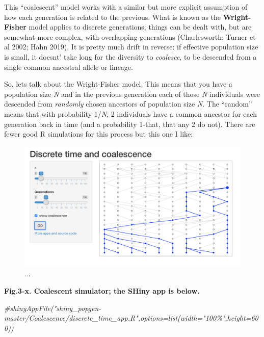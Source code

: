 \documentclass[
]{article}
\newenvironment{Shaded}{\begin{snugshade}}{\end{snugshade}}
\newcommand{\CommentTok}[1]{\textcolor[rgb]{0.56,0.35,0.01}{\textit{#1}}}
\begin{document}
This ``coalescent'' model works with a similar but more explicit
assumption of how each generation is related to the previous. What is
known as the \textbf{Wright-Fisher} model applies to discrete
generations; things can be dealt with, but are somewhat more complex,
with overlapping generations (Charlesworth; Turner et al 2002; Hahn
2019). It is pretty much drift in reverse: if effective population size
is small, it doesnt' take long for the diversity to \emph{coalesce}, to
be descended from a single common ancestral allele or lineage.

So, lets talk about the Wright-Fisher model. This means that you have a
population size \emph{N} and in the previous generation each of those
\emph{N} individuals were descended from \emph{randomly} chosen
ancestors of population size \emph{N}. The ``random'' means that with
probability 1/\emph{N}, 2 individuals have a common ancestor for each
generation back in time (and a probability 1-that, that any 2 do not).
There are fewer good R simulations for this process but this one I like:

\begin{figure}

{\centering \includegraphics[width=0.9\linewidth]{MEImages/coal1} 

}

\caption{...}\label{fig:unnamed-chunk-5}
\end{figure}

\textbf{Fig.3-x. Coalescent simulator; the SHiny app is below. }

\begin{Shaded}
\begin{Highlighting}[]
\CommentTok{\#shinyAppFile("shiny\_popgen{-}master/Coalescence/discrete\_time\_app.R",options=list(width="100\%",height=600))}
\end{Highlighting}
\end{Shaded}
\end{document}
